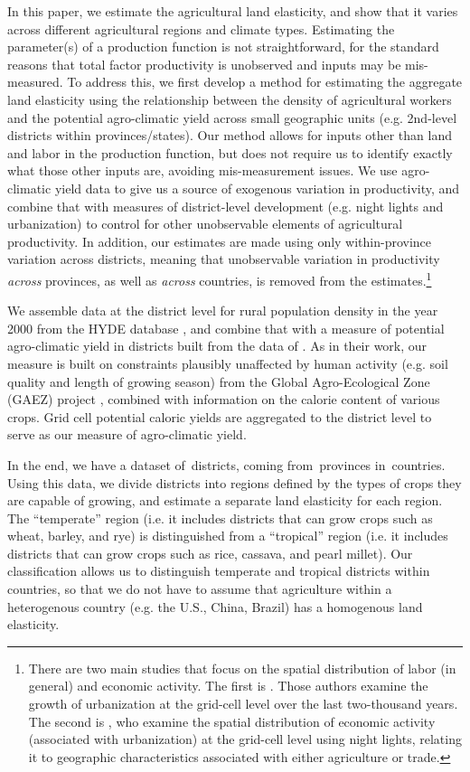 \documentclass[11pt]{article}
\begin{document}
In this paper, we estimate the agricultural land elasticity, and show that it varies across different agricultural regions and climate types. Estimating the parameter(s) of a production function is not straightforward, for the standard reasons that total factor productivity is unobserved and inputs may be mis-measured. To address this, we first develop a method for estimating the aggregate land elasticity using the relationship between the density of agricultural workers and the potential agro-climatic yield across small geographic units (e.g. 2nd-level districts within provinces/states). Our method allows for inputs other than land and labor in the production function, but does not require us to identify exactly what those other inputs are, avoiding mis-measurement issues. We use agro-climatic yield data to give us a source of exogenous variation in productivity, and combine that with measures of district-level development (e.g. night lights and urbanization) to control for other unobservable elements of agricultural productivity. In addition, our estimates are made using only within-province variation across districts, meaning that unobservable variation in productivity \textit{across} provinces, as well as \textit{across} countries, is removed from the estimates.\footnote{There are two main studies that focus on the spatial distribution of labor (in general) and economic activity. The first is \citet{mfm2014}. Those authors examine the growth of urbanization at the grid-cell level over the last two-thousand years. The second is \citet{hssw2016}, who examine the spatial distribution of economic activity (associated with urbanization) at the grid-cell level using night lights, relating it to geographic characteristics associated with either agriculture or trade.} 

We assemble data at the district level for rural population density in the year 2000 from the HYDE database \citep{hyde31}, and combine that with a measure of potential agro-climatic yield in districts built from the data of \citet{galorozak2016}. As in their work, our measure is built on constraints plausibly unaffected by human activity (e.g. soil quality and length of growing season) from the Global Agro-Ecological Zone (GAEZ) project \citep{gaez}, combined with information on the calorie content of various crops. Grid cell potential caloric yields are aggregated to the district level to serve as our measure of agro-climatic yield.

In the end, we have a dataset of\districts \ districts, coming from\provinces \ provinces in\countries \ countries. Using this data, we divide districts into regions defined by the types of crops they are capable of growing, and estimate a separate land elasticity for each region. The ``temperate'' region (i.e. it includes districts that can grow crops such as wheat, barley, and rye) is distinguished from a ``tropical'' region (i.e. it includes districts that can grow crops such as rice, cassava, and pearl millet). Our classification allows us to distinguish temperate and tropical districts within countries, so that we do not have to assume that agriculture within a heterogenous country (e.g. the U.S., China, Brazil) has a homogenous land elasticity.  
\end{document}
